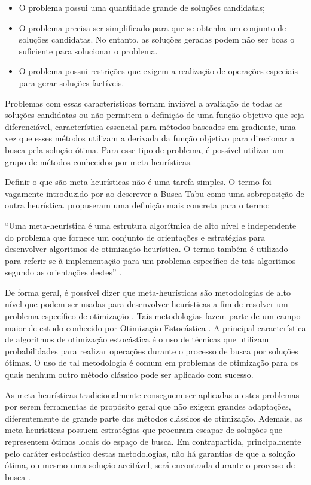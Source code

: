 \begin{itemize}
\item O problema possui uma quantidade grande de soluções candidatas;
\item O problema precisa ser simplificado para que se obtenha um conjunto de soluções candidatas. No entanto, as soluções geradas podem não ser boas o suficiente para solucionar o problema.
\item O problema possui restrições que exigem a realização de operações especiais para gerar soluções factíveis.
\end{itemize}

Problemas com essas características tornam inviável a avaliação de todas as soluções candidatas ou não permitem a definição de uma função objetivo que seja diferenciável, característica essencial para métodos baseados em gradiente, uma vez que esses métodos utilizam a derivada da função objetivo para direcionar a busca pela solução ótima. Para esse tipo de problema, é possível utilizar um grupo de métodos conhecidos por meta-heurísticas. 

Definir o que são meta-heurísticas não é uma tarefa simples. O termo foi vagamente introduzido por \cite{Glover1986} ao descrever a Busca Tabu como uma sobreposição de outra heurística. \cite{sorensen2013metaheuristics} propuseram uma definição mais concreta para o termo:


“Uma meta-heurística é uma estrutura algorítmica de alto nível e independente do problema que fornece um conjunto de orientações e estratégias para desenvolver algoritmos de otimização heurística. O termo também é utilizado para referir-se à implementação para um problema específico de tais algoritmos segundo as orientações destes” \cite{sorensen2013metaheuristics}.

De forma geral, é possível dizer que meta-heurísticas são metodologias de alto nível que podem ser usadas para desenvolver heurísticas a fim de resolver um problema específico de otimização \cite{Talbi2009}. Tais metodologias fazem parte de um campo maior de estudo conhecido por Otimização Estocástica \cite{Luke2013Metaheuristics}. A principal característica de algoritmos de otimização estocástica é o uso de técnicas que utilizam probabilidades para realizar operações durante o processo de busca por soluções ótimas. O uso de tal metodologia é comum em problemas de otimização para os quais nenhum outro método clássico pode ser aplicado com sucesso.

As meta-heurísticas tradicionalmente conseguem ser aplicadas a estes problemas por serem ferramentas de propósito geral que não exigem grandes adaptações, diferentemente de grande parte dos métodos clássicos de otimização. Ademais, as meta-heurísticas possuem estratégias que procuram escapar de soluções que representem ótimos locais do espaço de busca. Em contrapartida, principalmente pelo caráter estocástico destas metodologias, não há garantias de que a solução ótima, ou mesmo uma solução aceitável, será encontrada durante o processo de busca \cite{Talbi2009}. 


